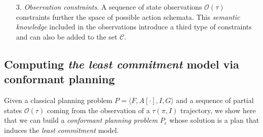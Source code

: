 \documentclass{article}
\newcommand{\tup}[1]{{\langle #1 \rangle}}
\begin{document}
\begin{enumerate}
\item[3.] {\em Observation constraints}. A sequence of state observations $\mathcal{O}(\tau)$ constraints further the space of possible action schemata. This \emph{semantic knowledge} included in the observations introduce a third type of constraints and can also be added to the set $\mathcal{C}$.
\end{enumerate}


\subsection{Computing {\em the least commitment} model via conformant planning}
Given a classical planning problem $P=\tup{F,A[\cdot],I,G}$ and a sequence of partial states $\mathcal{O}(\tau)$ coming from the observation of a $\tau(\pi,I)$ trajectory, we show here that we can build a {\em conformant planning problem} $P_c$ whose solution is a plan that induces the {\em least commitment} model.
\end{document}
